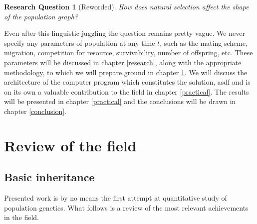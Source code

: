 \documentclass{l4proj}
\newtheorem*{quest}{Research Question}
\newif\ifdebug
\begin{document}
\begin{quest}[Reworded]
How does natural selection affect the shape of the population graph?
\end{quest}

Even after this linguistic juggling the question remains pretty vague. We never specify any parameters of population at any time $t$, such as the mating scheme, migration, competition for resource, survivability, number of offspring, etc. These parameters will be discussed in chapter \ref{research}, along with the appropriate methodology, to which we will prepare ground in chapter \ref{review}. We will discuss the architecture of the computer program which constitutes the solution, asdf and is on its own a valuable contribution to the field in chapter \ref{practical}. The results will be presented in chapter \ref{practical} and the conclusions will be drawn in chapter \ref{conclusion}.

\chapter{Review of the field}\label{review}

\ifdebug
  This should be a critical survey of the relevant literature, adhering to normal academic conventions in citing references, etc. Here I need to discuss coalescent method vs. forward-in time method vs. sample-based methods.

explain trait, explain mendelian genetics, explain homozygous, heterozygous, dominant, sweep, polymorphism example of polymorphism: impression of bitterness while eating brussel sprouts, linkage equilibrium, panmictic population, allele, epigenetics, probability density function.
\fi

\section{Basic inheritance}

Presented work is by no means the first attempt at quantitative study of population genetics. What follows is a review of the most relevant achievements in the field.
\end{document}
